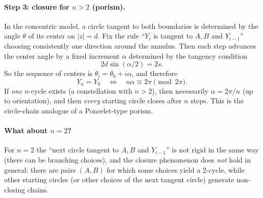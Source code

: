 \documentclass[12pt,a4paper]{article}
\theoremstyle{plain}
\theoremstyle{definition}      %
\begin{document}
\paragraph{Step 3: closure for $n>2$ (porism).}
In the concentric model, a circle tangent to both boundaries is determined by the angle $\theta$ of its center on $|z|=d$.
Fix the rule ``$Y_i$ is tangent to $A,B$ and $Y_{i-1}$'' choosing consistently one direction around the annulus.
Then each step advances the center angle by a fixed increment $\alpha$ determined by the tangency condition
\[
2d\sin(\alpha/2)=2s.
\]
So the sequence of centers is $\theta_i=\theta_0+i\alpha$, and therefore
\[
Y_n=Y_0 \quad\Longleftrightarrow\quad n\alpha\equiv 2\pi \pmod{2\pi}.
\]
If \emph{one} $n$-cycle exists (a constellation with $n>2$), then necessarily $\alpha=2\pi/n$ (up to orientation),
and then \emph{every} starting circle closes after $n$ steps. This is the circle-chain analogue of a Poncelet-type porism.

\paragraph{What about $n=2$?}
For $n=2$ the ``next circle tangent to $A,B$ and $Y_{i-1}$'' is not rigid in the same way (there can be branching choices),
and the closure phenomenon does \emph{not} hold in general: there are pairs $(A,B)$ for which some choices yield a 2-cycle,
while other starting circles (or other choices of the next tangent circle) generate non-closing chains.
\end{document}
